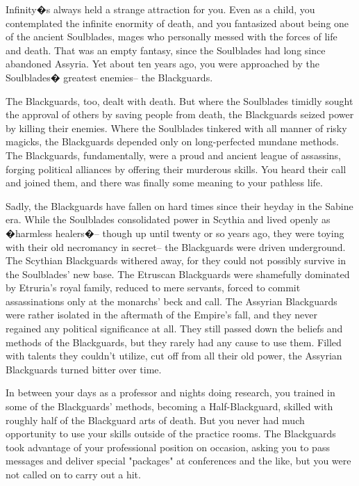 \documentclass[char]{Kos}
\begin{document}
Infinity�s always held a strange attraction for you. Even as a child, you contemplated the infinite enormity of death, and you fantasized about being one of the ancient Soulblades, mages who personally messed with the forces of life and death. That was an empty fantasy, since the Soulblades had long since abandoned Assyria. Yet about ten years ago, you were approached by the Soulblades� greatest enemies-- the Blackguards.

The Blackguards, too, dealt with death. But where the Soulblades timidly sought the approval of others by saving people from death, the Blackguards seized power by killing their enemies.  Where the Soulblades tinkered with all manner of risky magicks, the Blackguards depended only on long-perfected mundane methods. The Blackguards, fundamentally, were a proud and ancient league of assassins, forging political alliances by offering their murderous skills. You heard their call and joined them, and there was finally some meaning to your pathless life.

Sadly, the Blackguards have fallen on hard times since their heyday in the Sabine era. While the Soulblades consolidated power in Scythia and lived openly as �harmless healers�-- though up until twenty or so years ago, they were toying with their old necromancy in secret-- the Blackguards were driven underground. The Scythian Blackguards withered away, for they could not possibly survive in the Soulblades' new base. The Etruscan Blackguards were shamefully dominated by Etruria's royal family, reduced to mere servants, forced to commit assassinations only at the monarchs' beck and call. The Assyrian Blackguards were rather isolated in the aftermath of the Empire's fall, and they never regained any political significance at all. They still passed down the beliefs and methods of the Blackguards, but they rarely had any cause to use them. Filled with talents they couldn't utilize, cut off from all their old power, the Assyrian Blackguards turned bitter over time.

In between your days as a professor and nights doing research, you trained in some of the Blackguards' methods, becoming a Half-Blackguard, skilled with roughly half of the Blackguard arts of death. But you never had much opportunity to use your skills outside of the practice rooms. The Blackguards took advantage of your professional position on occasion, asking you to pass messages and deliver special "packages" at conferences and the like, but you were not called on to carry out a hit.
\end{document}
